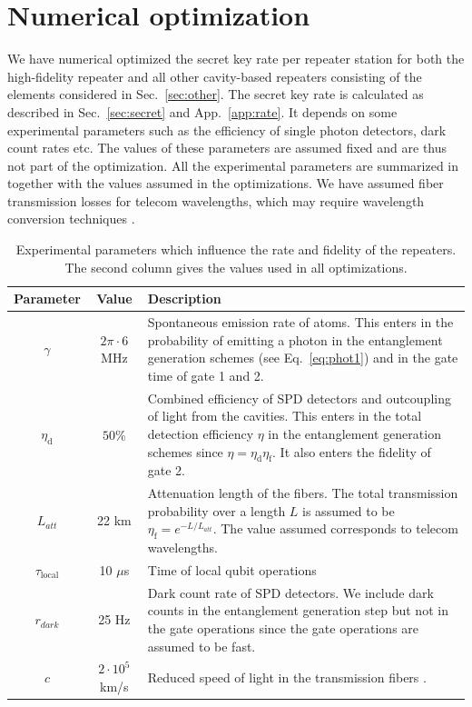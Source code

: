\section{Numerical optimization} \label{sec:optim}
We have numerical optimized the secret key rate per repeater station for both
the high-fidelity repeater and all other cavity-based repeaters consisting of
the elements considered in Sec.~\ref{sec:other}. The secret key rate is
calculated as described in Sec.~\ref{sec:secret} and App.~\ref{app:rate}. It
depends on some experimental parameters such as the efficiency of single photon
detectors, dark count rates etc. The values of these parameters are assumed
fixed and are thus not part of the optimization.  All the experimental
parameters are summarized in  together with the values
assumed in the optimizations. We have assumed fiber transmission losses for
telecom wavelengths, which may require wavelength conversion techniques
\cite{boris}.
{
\ssp
\begin{table}
\centering
\begin{tabular}{| c | c| p{8cm} | }
\hline
Parameter & Value & Description \\ \hline
$\gamma$ & $2\pi \cdot 6$ MHz & Spontaneous emission rate of atoms. This enters in the probability of emitting a photon in the entanglement generation schemes (see Eq.~\eqref{eq:phot1}) and in the gate time of gate 1 and 2. \\ \hline
$\eta_{\text{d}}$ & $50\%$ & Combined efficiency of SPD detectors and outcoupling of light from the cavities. This enters in the total detection efficiency $\eta$ in the entanglement generation schemes since $\eta=\eta_{\text{d}}\eta_{\text{f}}$. It also enters the fidelity of gate 2. \\ \hline 
$L_{att}$ & 22 km  & Attenuation length of the fibers. The total transmission probability over a length $L$ is assumed to be $\eta_{\text{f}}=e^{-L/L_{att}}$. The value assumed corresponds to telecom wavelengths.  \\ \hline
$\tau_{\text{local}}$ & 10 $\mu$s & Time of local qubit operations  \\ \hline
$r_{dark}$ & 25 Hz & Dark count rate of SPD detectors. We include dark counts in the entanglement generation step but not in the gate operations since the gate operations are assumed to be fast.  \\ \hline
$c$ & $2\cdot 10^{5}$ km/s & Reduced speed of light in the transmission fibers \cite{sangouard3}. \\ \hline
\end{tabular}
\caption[Parameters in the numerical optimization]{Experimental parameters which
influence the rate and fidelity of the repeaters. The second column gives the
values used in all optimizations.}
\label{tab:parameter}
\end{table}
}
